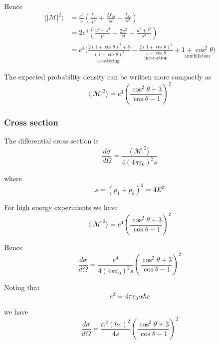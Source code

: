Hence
\begin{align*}
\langle|\mathcal{M}|^2\rangle
&=\frac{e^4}{4}
\left(\frac{f_{11}}{t^2}+\frac{2f_{12}}{st}+\frac{f_{22}}{s^2}\right)
\\
&=2e^4\left(\frac{u^2+s^2}{t^2}+\frac{2u^2}{st}+\frac{u^2+t^2}{s^2}\right)
\\
&=e^4\biggl(
\underset{\text{scattering}}
{\frac{2(1+\cos\theta)^2+8}{(1-\cos\theta)^2}}
-\underset{\text{interaction}}
{\frac{2(1+\cos\theta)^2}{1-\cos\theta}}
+\underset{\text{annihilation}}
{1+\cos^2\theta}
\biggr)
\end{align*}

The expected probability density can be written more compactly as
\begin{equation*}
\langle|\mathcal{M}|^2\rangle=e^4\left(\frac{\cos^2\theta+3}{\cos\theta-1}\right)^2
\end{equation*}

\subsubsection*{Cross section}

The differential cross section is
\begin{equation*}
\frac{d\sigma}{d\Omega}=\frac{\langle|\mathcal{M}|^2\rangle}{4(4\pi\varepsilon_0)^2s}
\end{equation*}

where
\begin{equation*}
s=(p_1+p_2)^2=4E^2
\end{equation*}

For high energy experiments we have
\begin{equation*}
\langle|\mathcal{M}|^2\rangle=e^4\left(\frac{\cos^2\theta+3}{\cos\theta-1}\right)^2
\end{equation*}

Hence
\begin{equation*}
\frac{d\sigma}{d\Omega}=\frac{e^4}{4(4\pi\varepsilon_0)^2s}
\left(\frac{\cos^2\theta+3}{\cos\theta-1}\right)^2
\end{equation*}

Noting that
\begin{equation*}
e^2=4\pi\varepsilon_0\alpha\hbar c
\end{equation*}

we have
\begin{equation*}
\frac{d\sigma}{d\Omega}
=\frac{\alpha^2(\hbar c)^2}{4s}
\left(\frac{\cos^2\theta+3}{\cos\theta-1}\right)^2
\end{equation*}

